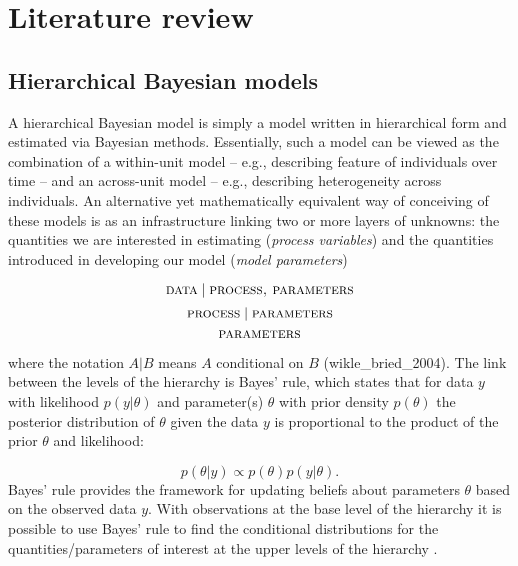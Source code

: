 
\chapter{Literature review}

\section{Hierarchical Bayesian models}

A hierarchical Bayesian model is simply a model written in hierarchical form and estimated via Bayesian methods. Essentially, such a model can be viewed as the combination of a within-unit model -- e.g., describing  feature of individuals over time -- and an across-unit model -- e.g., describing heterogeneity across individuals.  An alternative yet mathematically equivalent way of conceiving of these models is as an infrastructure linking two or more layers of unknowns: the quantities we are interested in estimating ({\it process variables}) and  the quantities introduced in developing our model ({\it model parameters})

{\singlespacing
$$ \textsc{data} \mid \textsc{process, parameters}$$
$$\textsc{process} \mid \textsc{parameters}$$
$$\textsc{parameters}$$ 
}

\noindent where the notation $A | B$ means $A$ conditional on $B$ (wikle\_bried\_2004). The link between the levels of the hierarchy is Bayes' rule, which states that for data $y$ with likelihood $p(y | \theta)$ and parameter(s) $\theta$ with prior density $p(\theta)$ the posterior distribution of $\theta$ given the data $y$ is proportional to the product of the prior $\theta$ and likelihood: 

{\singlespacing
 $$p(\theta | y ) \propto p(\theta) p(y | \theta). $$
}
%
\noindent Bayes' rule provides the framework for updating beliefs about parameters $\theta$ based on the observed data $y$.  With observations at the base level of the hierarchy it is possible to use Bayes' rule to find the conditional distributions for the quantities/parameters of interest at the upper levels of the hierarchy . 









